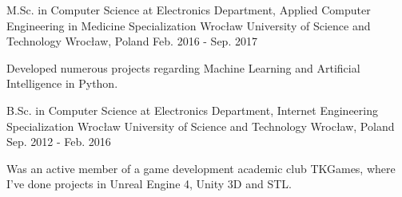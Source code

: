 

\begin{cventries}

  \cventry
    {M.Sc. in Computer Science at Electronics Department, Applied Computer Engineering in Medicine Specialization} %
    {Wrocław University of Science and Technology} %
    {Wrocław, Poland} %
    {Feb. 2016 - Sep. 2017} %
    {
        \begin{cvitems}
            Developed numerous projects regarding Machine Learning and Artificial Intelligence in Python.
        \end{cvitems}
    }

  \cventry
    {B.Sc. in Computer Science at Electronics Department, Internet Engineering Specialization} %
    {Wrocław University of Science and Technology} %
    {Wrocław, Poland} %
    {Sep. 2012 - Feb. 2016} %
    {
        \begin{cvitems}
            Was an active member of a game development academic club TKGames, where I've done projects in Unreal Engine 4, Unity 3D and STL.
        \end{cvitems}
    }

\end{cventries}

